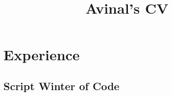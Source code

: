 \documentclass[a4paper]{comcv}
\title{Avinal's CV}
\begin{document}
    \section{Experience}
    \subsection{Script Winter of Code}
\end{document}
